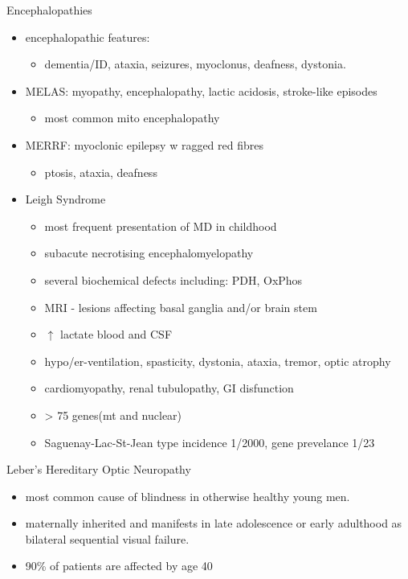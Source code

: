 \documentclass[presentation, smaller]{beamer}
\begin{document}
\begin{frame}[label={sec:org32c2928}]{Encephalopathies}
\begin{itemize}
\item encephalopathic features:
\begin{itemize}
\item dementia/ID, ataxia, seizures, myoclonus, deafness, dystonia.
\end{itemize}
\item MELAS: myopathy, encephalopathy, lactic acidosis, stroke-like episodes
\begin{itemize}
\item most common mito encephalopathy
\end{itemize}
\item MERRF: myoclonic epilepsy w ragged red fibres
\begin{itemize}
\item ptosis, ataxia, deafness
\end{itemize}
\item Leigh Syndrome
\begin{itemize}
\item most frequent presentation of MD in childhood
\item subacute necrotising encephalomyelopathy
\item several biochemical defects including: PDH, OxPhos
\item MRI - lesions affecting basal ganglia and/or brain stem
\item \(\uparrow\) lactate blood and CSF
\item hypo/er-ventilation, spasticity, dystonia, ataxia, tremor, optic atrophy
\item cardiomyopathy, renal tubulopathy, GI disfunction
\item \textgreater{} 75 genes(mt and nuclear)
\item Saguenay-Lac-St-Jean type incidence 1/2000, gene prevelance 1/23
\end{itemize}
\end{itemize}
\end{frame}

\begin{frame}[label={sec:orgedde3d0}]{Leber’s Hereditary Optic Neuropathy}
\begin{itemize}
\item most common cause of blindness in otherwise healthy young men.
\item maternally inherited and manifests in late adolescence or early
adulthood as bilateral sequential visual failure.
\item 90\% of patients are affected by age 40
\end{itemize}
\end{frame}
\end{document}
